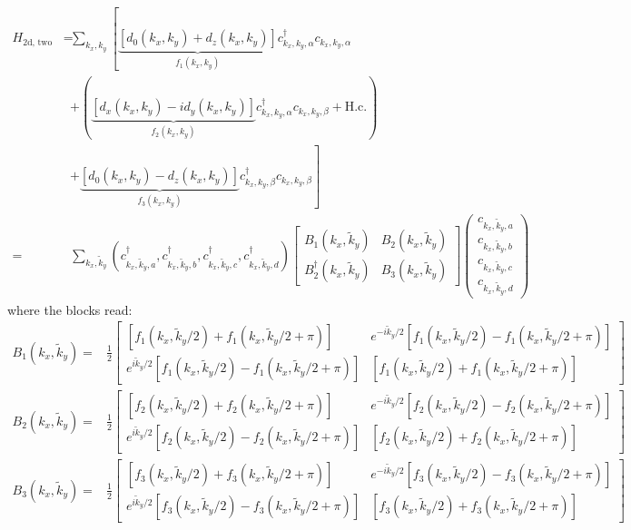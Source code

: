 \documentclass[english]{scrartcl}
\begin{document}
\begin{align*}
H_\text{2d, two band} =& \sum_{k_x, k_y} \left [ \underbrace{\left[d_0(k_x, k_y) +  d_z(k_x, k_y) \right]}_{f_1(k_x, k_y)} c^\dagger_{k_x, k_y, \alpha} c_{k_x, k_y, \alpha} \right . \\
& + \left( \underbrace{\left[ d_x(k_x, k_y) - i d_y(k_x, k_y) \right ]}_{f_2(k_x, k_y)} c^\dagger_{k_x, k_y, \alpha} c_{k_x, k_y, \beta} + \text{H.c.} \right )\\
&+ \left . \underbrace{\left [d_0(k_x, k_y) - d_z(k_x, k_y)\right]}_{f_3(k_x, k_y)} c^\dagger_{k_x, k_y, \beta} c_{k_x, k_y, \beta} \right] \\
=& \sum_{k_x, \tilde k_y} \left(c^\dagger_{k_x, \tilde k_y, a}, c^\dagger_{k_x, \tilde k_y, b}, c^\dagger_{k_x, \tilde k_y, c}, c^\dagger_{k_x, \tilde k_y, d}\right) 
\begin{bmatrix}
B_1(k_x, \tilde k_y) & B_2(k_x, \tilde k_y)\\
B_2^\dagger(k_x, \tilde k_y) & B_3(k_x, \tilde k_y)
\end{bmatrix}
\begin{pmatrix}
c_{k_x, \tilde k_y, a} \\
c_{k_x, \tilde k_y, b} \\
c_{k_x, \tilde k_y, c} \\
c_{k_x, \tilde k_y, d}
\end{pmatrix}
\end{align*}
where the blocks read:
\begin{align*}
B_1(k_x, \tilde k_y) =& \frac{1}{2}
\begin{bmatrix}
 [f_1(k_x, \tilde k_y / 2) + f_1(k_x, \tilde k_y / 2 + \pi)]  &  e^{-i\tilde k_y / 2}[f_1(k_x, \tilde k_y / 2) - f_1(k_x, \tilde k_y / 2 + \pi)] \\
 e^{i\tilde k_y / 2}[f_1(k_x, \tilde k_y / 2) - f_1(k_x, \tilde k_y / 2 + \pi)] &  [f_1(k_x, \tilde k_y / 2) + f_1(k_x, \tilde k_y / 2 + \pi)] 
\end{bmatrix} \\
B_2(k_x, \tilde k_y) =& \frac{1}{2}
\begin{bmatrix}
 [f_2(k_x, \tilde k_y / 2) + f_2(k_x, \tilde k_y / 2 + \pi)]  &  e^{-i\tilde k_y / 2}[f_2(k_x, \tilde k_y / 2) - f_2(k_x, \tilde k_y / 2 + \pi)] \\
 e^{i\tilde k_y / 2}[f_2(k_x, \tilde k_y / 2) - f_2(k_x, \tilde k_y / 2 + \pi)] &  [f_2(k_x, \tilde k_y / 2) + f_2(k_x, \tilde k_y / 2 + \pi)] 
\end{bmatrix} \\ 
B_3(k_x, \tilde k_y) =& \frac{1}{2}
\begin{bmatrix}
 [f_3(k_x, \tilde k_y / 2) + f_3(k_x, \tilde k_y / 2 + \pi)]  &  e^{-i\tilde k_y / 2}[f_3(k_x, \tilde k_y / 2) - f_3(k_x, \tilde k_y / 2 + \pi)] \\
 e^{i\tilde k_y / 2}[f_3(k_x, \tilde k_y / 2) - f_3(k_x, \tilde k_y / 2 + \pi)] &  [f_3(k_x, \tilde k_y / 2) + f_3(k_x, \tilde k_y / 2 + \pi)] 
\end{bmatrix}
\end{align*}
\end{document}
